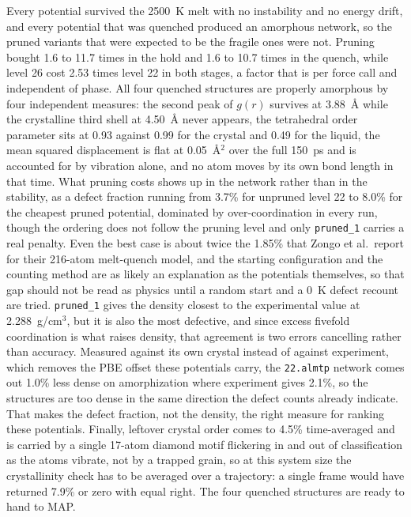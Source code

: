 \documentclass[11pt]{article}
\begin{document}
Every potential survived the 2500~K melt with no instability and no energy drift, and every potential that was quenched produced an amorphous network, so the pruned variants that were expected to be the fragile ones were not. Pruning bought 1.6 to 11.7 times in the hold and 1.6 to 10.7 times in the quench, while level 26 cost 2.53 times level 22 in both stages, a factor that is per force call and independent of phase. All four quenched structures are properly amorphous by four independent measures: the second peak of $g(r)$ survives at 3.88~\AA{} while the crystalline third shell at 4.50~\AA{} never appears, the tetrahedral order parameter sits at 0.93 against 0.99 for the crystal and 0.49 for the liquid, the mean squared displacement is flat at 0.05~\AA$^2$ over the full 150~ps and is accounted for by vibration alone, and no atom moves by its own bond length in that time. What pruning costs shows up in the network rather than in the stability, as a defect fraction running from 3.7\% for unpruned level 22 to 8.0\% for the cheapest pruned potential, dominated by over-coordination in every run, though the ordering does not follow the pruning level and only \texttt{pruned\_1} carries a real penalty. Even the best case is about twice the 1.85\% that Zongo et al.\ report for their 216-atom melt-quench model, and the starting configuration and the counting method are as likely an explanation as the potentials themselves, so that gap should not be read as physics until a random start and a 0~K defect recount are tried. \texttt{pruned\_1} gives the density closest to the experimental value at 2.288~g/cm$^3$, but it is also the most defective, and since excess fivefold coordination is what raises density, that agreement is two errors cancelling rather than accuracy. Measured against its own crystal instead of against experiment, which removes the PBE offset these potentials carry, the \texttt{22.almtp} network comes out 1.0\% less dense on amorphization where experiment gives 2.1\%, so the structures are too dense in the same direction the defect counts already indicate. That makes the defect fraction, not the density, the right measure for ranking these potentials. Finally, leftover crystal order comes to 4.5\% time-averaged and is carried by a single 17-atom diamond motif flickering in and out of classification as the atoms vibrate, not by a trapped grain, so at this system size the crystallinity check has to be averaged over a trajectory: a single frame would have returned 7.9\% or zero with equal right. The four quenched structures are ready to hand to MAP.
\end{document}
